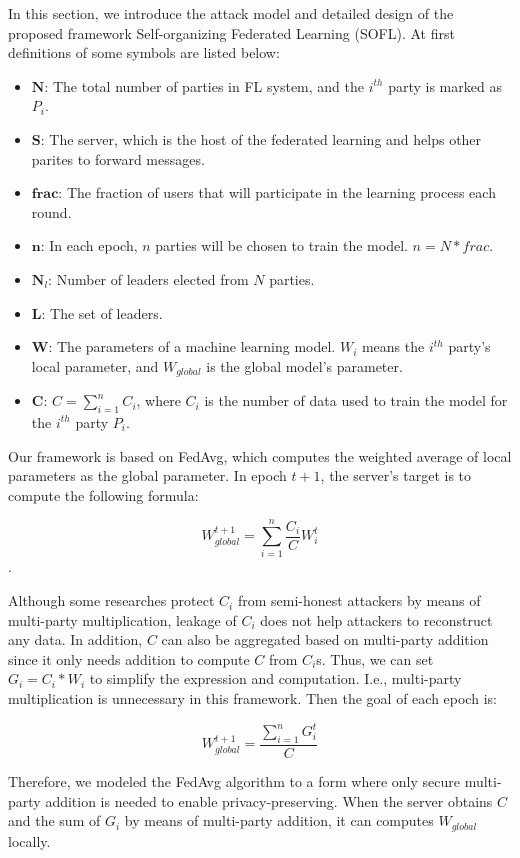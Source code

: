 In this section, we introduce the attack model and detailed design of the proposed framework Self-organizing Federated Learning (SOFL). At first definitions of some symbols are listed below:
\begin{itemize}
    \item $\textbf{N}$: The total number of parties in FL system, and the  $i^{th}$ party is marked as $P_i$.
    \item $\textbf{S}$: The server, which is the host of the federated learning and helps other parites to forward messages.
    \item $\textbf{frac}$: The fraction of users that will participate in the learning process each round.
    \item $\textbf{n}$: In each epoch, $n$ parties will be chosen to train the model. $n = N * frac$.
    \item $\textbf{N}_l$: Number of leaders elected from $N$ parties.
    \item $\textbf{L}$: The set of leaders.
    \item $\textbf{W}$: The parameters of a machine learning model. $W_i$ means the $i^{th}$ party's local parameter, and $W_{global}$ is the global model's parameter.
    \item $\textbf{C}$: $C = \sum_{i=1}^nC_i$, where $C_i$ is the number of data used to train the model for the $i^{th}$ party $P_i$.
\end{itemize}

Our framework is based on FedAvg, which computes the weighted average of local parameters as the global parameter. In epoch $t+1$, the server's target is to compute the following formula:

$$W_{global}^{t+1} = \sum_{i=1}^n\frac{C_i}{C}W_i^t$$. 

Although some researches protect $C_i$ from semi-honest attackers by means of multi-party multiplication, leakage of $C_i$ does not help attackers to reconstruct any data. In addition, $C$ can also be aggregated based on multi-party addition since it only needs addition to compute $C$ from $C_i$s. Thus, we can set $G_i = C_i * W_i$ to simplify the expression and computation. I.e., multi-party multiplication is unnecessary in this framework. Then the goal of each epoch is:

$$ W_{global}^{t+1} = \frac{\sum_{i=1}^nG_i^t}{C} $$

Therefore, we modeled the FedAvg algorithm to a form where only secure multi-party addition is needed to enable privacy-preserving. When the server obtains $C$ and the sum of $G_i$ by means of multi-party addition, it can computes $W_{global}$ locally.


